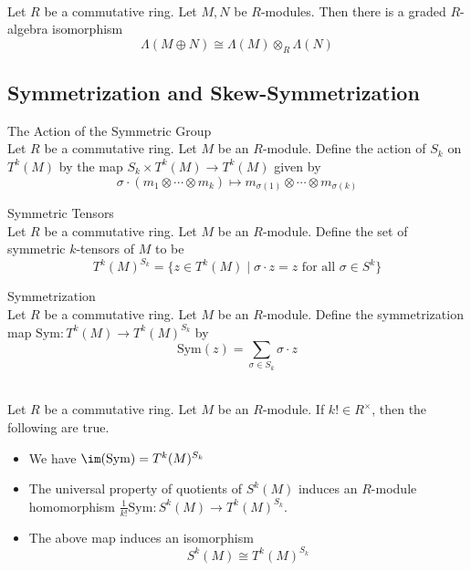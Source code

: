 \documentclass[a4paper]{article}
\begin{document}
\begin{prp}{}{}\\
Let $R$ be a commutative ring. Let $M,N$ be $R$-modules. Then there is a graded $R$-algebra isomorphism $$\Lambda(M\oplus N)\cong\Lambda(M)\otimes_R\Lambda(N)$$
\end{prp}

\subsection{Symmetrization and Skew-Symmetrization}
\begin{defn}{The Action of the Symmetric Group}{}\\
Let $R$ be a commutative ring. Let $M$ be an $R$-module. Define the action of $S_k$ on $T^k(M)$ by the map $S_k\times T^k(M)\to T^k(M)$ given by $$\sigma\cdot(m_1\otimes\cdots\otimes m_k)\mapsto m_{\sigma(1)}\otimes\cdots\otimes m_{\sigma(k)}$$
\end{defn}

\begin{defn}{Symmetric Tensors}{}\\
Let $R$ be a commutative ring. Let $M$ be an $R$-module. Define the set of symmetric $k$-tensors of $M$ to be $$T^k(M)^{S_k}=\{z\in T^k(M)\;|\;\sigma\cdot z=z\text{ for all }\sigma\in S^k\}$$
\end{defn}

\begin{defn}{Symmetrization}{}\\
Let $R$ be a commutative ring. Let $M$ be an $R$-module. Define the symmetrization map $\text{Sym}:T^k(M)\to T^k(M)^{S_k}$ by $$\text{Sym}(z)=\sum_{\sigma\in S_k}\sigma\cdot z$$
\end{defn}

\begin{lmm}{}{}\\
Let $R$ be a commutative ring. Let $M$ be an $R$-module. If $k!\in R^\times$, then the following are true. 
\begin{itemize}
\item We have $\im(\text{Sym})=T^k(M)^{S_k}$
\item The universal property of quotients of $S^k(M)$ induces an $R$-module homomorphism $\frac{1}{k!}\text{Sym}:S^k(M)\to T^k(M)^{S_k}$. 
\item The above map induces an isomorphism $$S^k(M)\cong T^k(M)^{S_k}$$
\end{itemize}
\end{lmm}
\end{document}
